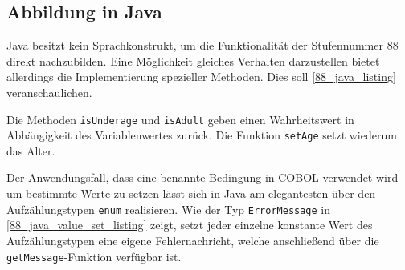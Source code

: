 \subsection*{Abbildung in Java}
Java besitzt kein Sprachkonstrukt, um die Funktionalität der Stufennummer 88 direkt nachzubilden. Eine Möglichkeit gleiches Verhalten darzustellen bietet allerdings die Implementierung spezieller Methoden. Dies soll \autoref{88_java_listing} veranschaulichen.\\


Die Methoden \texttt{isUnderage} und \texttt{isAdult} geben einen Wahrheitswert in Abhängigkeit des Variablenwertes zurück. Die Funktion \texttt{setAge} setzt wiederum das Alter.\\


Der Anwendungsfall, dass eine benannte Bedingung in COBOL verwendet wird um bestimmte Werte zu setzen lässt sich in Java am elegantesten über den Aufzählungstypen \texttt{enum} realisieren. Wie der Typ \texttt{ErrorMessage} in \autoref{88_java_value_set_listing} zeigt, setzt jeder einzelne konstante Wert des Aufzählungstypen eine eigene Fehlernachricht, welche anschließend über die \texttt{getMessage}-Funktion verfügbar ist.\\
